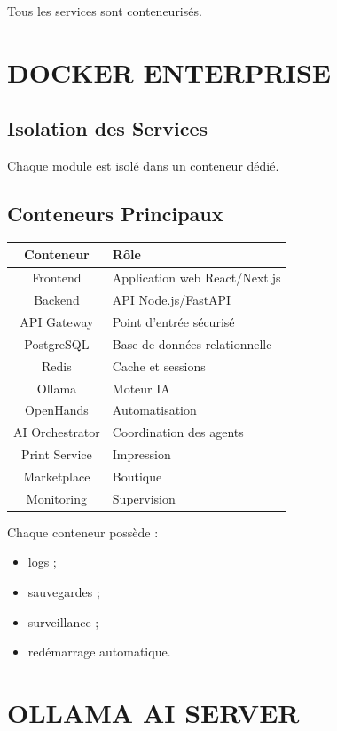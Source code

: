 \documentclass[12pt,a4paper,oneside]{book}
\begin{document}
Tous les services sont conteneurisés.

\chapter{DOCKER ENTERPRISE}

\section{Isolation des Services}
Chaque module est isolé dans un conteneur dédié.

\section{Conteneurs Principaux}
\begin{center}
\begin{tabular}{|c|p{10cm}|}
\hline
\rowcolor{electronblue}
\color{white}\textbf{Conteneur} & \color{white}\textbf{Rôle} \\
\hline
Frontend & Application web React/Next.js \\
\hline
Backend & API Node.js/FastAPI \\
\hline
API Gateway & Point d'entrée sécurisé \\
\hline
PostgreSQL & Base de données relationnelle \\
\hline
Redis & Cache et sessions \\
\hline
Ollama & Moteur IA \\
\hline
OpenHands & Automatisation \\
\hline
AI Orchestrator & Coordination des agents \\
\hline
Print Service & Impression \\
\hline
Marketplace & Boutique \\
\hline
Monitoring & Supervision \\
\hline
\end{tabular}
\end{center}

Chaque conteneur possède :
\begin{itemize}
\item logs ;
\item sauvegardes ;
\item surveillance ;
\item redémarrage automatique.
\end{itemize}

\chapter{OLLAMA AI SERVER}
\end{document}
